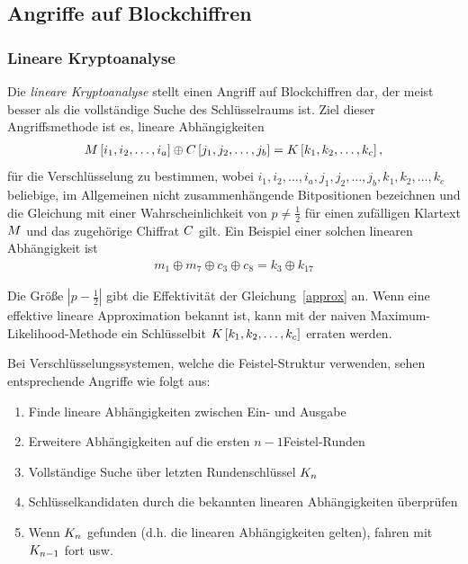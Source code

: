 \subsection{Angriffe auf Blockchiffren}

\subsubsection{Lineare Kryptoanalyse}
\label{sssec:linKryptoanalyse}
Die \textit{lineare Kryptoanalyse} stellt einen Angriff auf Blockchiffren dar, der meist besser als die vollständige Suche des Schlüsselraums ist. Ziel dieser Angriffsmethode ist es, lineare Abhängigkeiten
\begin{align}
	M \left[ i_1, i_2, \ldots, i_a \right] \oplus C \left[ j_1, j_2, \ldots, j_b \right]  = K \left[ k_1, k_2, \ldots, k_c \right], \label{approx}
\end{align}
für die Verschlüsselung zu bestimmen, wobei  $i_1, i_2, \ldots, i_a, j_1, j_2, \ldots, j_b,k_1, k_2, \ldots, k_c$ beliebige, im Allgemeinen nicht zusammenhängende Bitpositionen
bezeichnen und die Gleichung mit einer Wahrscheinlichkeit von $p \neq \frac{1}{2}$ für einen zufälligen Klartext $M$ und das zugehörige Chiffrat $C$ gilt. 
Ein Beispiel einer solchen linearen Abhängigkeit ist
\begin{align*}
	m_1 \oplus m_7 \oplus c_3 \oplus c_8 = k_3 \oplus k_{17}
\end{align*}

Die Größe $\left|{p-\frac{1}{2}}\right|$ gibt die Effektivität der Gleichung~\ref{approx} an. Wenn eine effektive lineare Approximation bekannt ist, kann mit der naiven Maximum-Likelihood-Methode ein
Schlüsselbit $K \left[ k_1, k_2, \ldots, k_c \right]$ erraten werden.

Bei Verschlüsselungssystemen, welche die Feistel-Struktur verwenden, sehen entsprechende Angriffe wie folgt aus:
\begin{enumerate}
	\item Finde lineare Abhängigkeiten zwischen Ein- und Ausgabe
	\item Erweitere Abhängigkeiten auf die ersten $n - 1$Feistel-Runden
	\item Vollständige Suche über letzten Rundenschlüssel $K_n$
	\item Schlüsselkandidaten durch die bekannten linearen Abhängigkeiten überprüfen
	\item Wenn $K_n$ gefunden (d.h. die linearen Abhängigkeiten gelten), fahren mit $K_{n-1}$ fort usw.
\end{enumerate}

